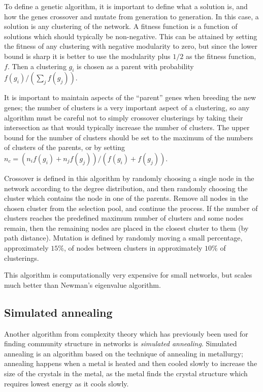 To define a genetic algorithm, it is important to define what a solution is, and how the genes crossover and mutate from generation to generation. In this case, a solution is any clustering of the network.  A fitness function is a function of solutions which should typically be non-negative. This can be attained by setting the fitness of any clustering with negative modularity to zero, but since the lower bound is sharp it is better to use the modularity plus $1/2$ as the fitness function, $f$. Then a clustering $g_i$ is chosen as a parent with probability $f(g_i)/(\sum_j f(g_j))$.

It is important to maintain aspects of the ``parent'' genes when breeding the new genes; the number of clusters is a very important aspect of a clustering, so any algorithm must be careful not to simply crossover clusterings by taking their intersection as that would typically increase the number of clusters.  The upper bound for the number of clusters should be set to the maximum of the numbers of clusters of the parents, or by setting $n_c = \left(n_i f(g_i)+n_j f(g_j)\right)/(f(g_i)+f(g_j))$.

Crossover is defined in this algorithm by randomly choosing a single node in the network according to the degree distribution, and then randomly choosing the cluster which contains the node in one of the parents.  Remove all nodes in the chosen cluster from the selection pool, and continue the process.  If the number of clusters reaches the predefined maximum number of clusters and some nodes remain, then the remaining nodes are placed in the closest cluster to them (by path distance).  Mutation is defined by randomly moving a small percentage, approximately $15\%$, of nodes between clusters in approximately $10\%$ of clusterings.

This algorithm is computationally very expensive for small networks, but scales much better than Newman's eigenvalue algorithm.

\subsection{Simulated annealing}

Another algorithm from complexity theory which has previously been used for finding community structure in networks is \emph{simulated annealing}.  Simulated annealing is an algorithm based on the technique of annealing in metallurgy; annealing happens when a metal is heated and then cooled slowly to increase the size of the crystals in the metal, as the metal finds the crystal structure which requires lowest energy as it cools slowly.

